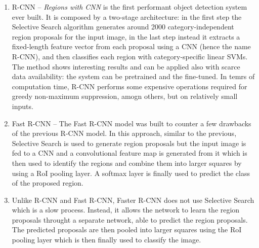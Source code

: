 \begin{enumerate}[label=(\alph*)]
  \item R-CNN -- \emph{Regions with CNN} is the first performant
  object detection system ever built. It is composed by a two-stage
  architecture: in the first step the Selective Search algorithm
  generates around 2000 category-independent region proposals for the
  input image, in the last step instead it extracts a fixed-length
  feature vector from each proposal using a CNN (hence the name
  R-CNN), and then classifies each region with category-specific
  linear SVMs. The method shows interesting results and can be applied
  also with scarce data availability: the system can be pretrained and
  the fine-tuned. In temrs of computation time, R-CNN performs some
  expensive operations required for greedy non-maximum suppression,
  amogn others, but on relatively small inputs.
  \item Fast R-CNN -- The Fast R-CNN model was built to counter a few
  drawbacks of the previous R-CNN model. In this approach, similar to
  the previous, Selective Search is used to generate region proposals
  but the input image is fed to a CNN and a convolutional feature map
  is generated from it which is then used to identify the regions and
  combine them into larger squares by using a RoI pooling layer. A
  softmax layer is finally used to predict the class of the proposed
  region.
  \item Unlike R-CNN and Fast R-CNN, Faster R-CNN does not use
  Selective Search which is a slow process. Instead, it allows the
  network to learn the region proposals throught a separate network,
  able to predict the region proposals. The predicted proposals are
  then pooled into larger squares using the RoI pooling layer which is
  then finally used to classify the image.
\end{enumerate}

